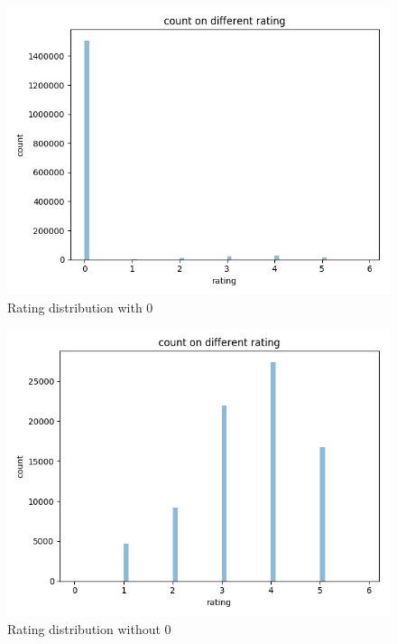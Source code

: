 \documentclass[journal, a4paper]{IEEEtran}
\begin{document}
\begin{figure}[!htb]
	\begin{center}
	\includegraphics[width=\columnwidth]{mf_cr_0}
	\caption{Rating distribution with 0}
	\label{fig:mf_cr_0}
	\end{center}
\end{figure}

\begin{figure}[!htb]
	\begin{center}
	\includegraphics[width=\columnwidth]{mf_cr}
	\caption{Rating distribution without 0}
	\label{fig:mf_cr}
	\end{center}
\end{figure}
\end{document}
